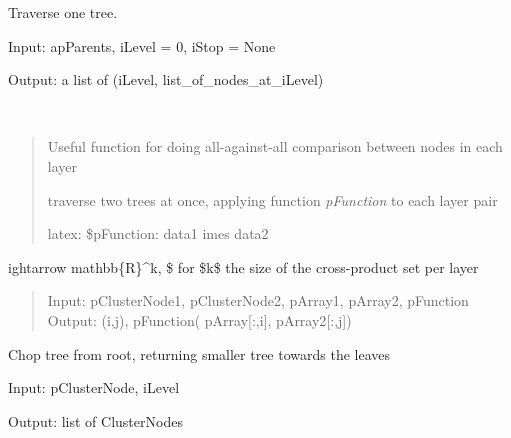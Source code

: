 \documentclass[letterpaper,10pt,english]{sphinxmanual}
\begin{document}
\begin{fulllineitems}
\label{index:halla.hierarchy.reduce_tree_by_layer}
Traverse one tree.

Input: apParents, iLevel = 0, iStop = None

Output: a list of (iLevel, list\_of\_nodes\_at\_iLevel)

\end{fulllineitems}


\begin{fulllineitems}
\label{index:halla.hierarchy.traverse_by_layer}~\begin{quote}

Useful function for doing all-against-all comparison between nodes in each layer

traverse two trees at once, applying function \emph{pFunction} to each layer pair

latex: \$pFunction: data1        imes data2
\end{quote}

ightarrow mathbb\{R\}\textasciicircum{}k, \$ for \$k\$ the size of the cross-product set per layer
\begin{quote}

Input: pClusterNode1, pClusterNode2, pArray1, pArray2, pFunction
Output: (i,j), pFunction( pArray{[}:,i{]}, pArray2{[}:,j{]})
\end{quote}

\end{fulllineitems}


\begin{fulllineitems}
\label{index:halla.hierarchy.truncate_tree}
Chop tree from root, returning smaller tree towards the leaves

Input: pClusterNode, iLevel

Output: list of ClusterNodes

\end{fulllineitems}
\end{document}
